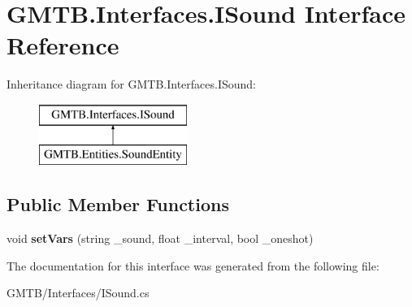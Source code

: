 \hypertarget{interface_g_m_t_b_1_1_interfaces_1_1_i_sound}{}\section{G\+M\+T\+B.\+Interfaces.\+I\+Sound Interface Reference}
\label{interface_g_m_t_b_1_1_interfaces_1_1_i_sound}
Inheritance diagram for G\+M\+T\+B.\+Interfaces.\+I\+Sound\+:\begin{figure}[H]
\begin{center}
\leavevmode
\includegraphics[height=2.000000cm]{interface_g_m_t_b_1_1_interfaces_1_1_i_sound}
\end{center}
\end{figure}
\subsection*{Public Member Functions}
\begin{DoxyCompactItemize}
\item 
\mbox{\label{interface_g_m_t_b_1_1_interfaces_1_1_i_sound_a0c8915e0886db43847bedad3a3e80c62}} 
void {\bfseries set\+Vars} (string \+\_\+sound, float \+\_\+interval, bool \+\_\+oneshot)
\end{DoxyCompactItemize}


The documentation for this interface was generated from the following file\+:\begin{DoxyCompactItemize}
\item 
G\+M\+T\+B/\+Interfaces/I\+Sound.\+cs\end{DoxyCompactItemize}
